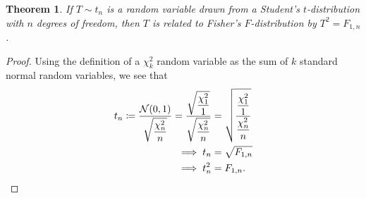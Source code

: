 \documentclass[letterpaper, reqno]{amsart}
\newtheorem{theorem}{Theorem}[section]
\numberwithin{equation}{section}
\newcommand{\ddfrac}[2]{\frac{\displaystyle #1}{\displaystyle #2}}
\newcommand{\N}[2]{\mathcal{N}\mleft( #1, #2 \mright)}
\begin{document}
\begin{theorem}
  If $T \sim t_n$ is a random variable drawn from a Student's
  $t$-distribution with $n$ degrees of freedom, then $T$ is related to
  Fisher's $F$-distribution by $T^2 = F_{1, n}$.
\end{theorem}

\begin{proof}
  Using the definition of a $\chi^2_k$ random variable as the sum of $k$
  standard normal random variables, we see that
  \begin{align*}
    t_n \coloneqq \ddfrac{\N{0}{1}}{\sqrt{\frac{\chi^2_n}{n}}} 
    = \ddfrac{\sqrt{\frac{\chi^2_1}{1}}}{\sqrt{\frac{\chi^2_n}{n}}} 
    &= \sqrt{\ddfrac{\frac{\chi^2_1}{1}}{\frac{\chi^2_n}{n}}} \\
    \implies t_n &= \sqrt{F_{1, n}} \\
    \implies t_n^2 &= F_{1, n}. \qedhere
  \end{align*}
\end{proof}
\end{document}
